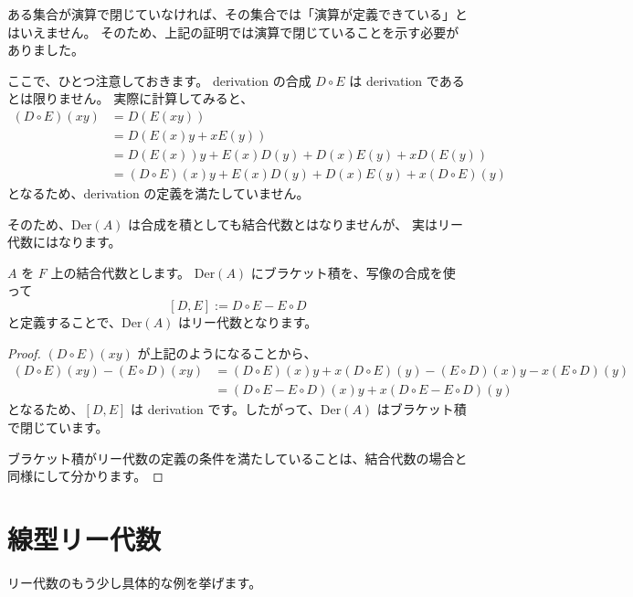 \documentclass{ltjsarticle}
\begin{document}
ある集合が演算で閉じていなければ、その集合では「演算が定義できている」とはいえません。
そのため、上記の証明では演算で閉じていることを示す必要がありました。

ここで、ひとつ注意しておきます。
derivation の合成 $D \circ E$ は derivation であるとは限りません。
実際に計算してみると、
\begin{align*}
    (D \circ E)(xy) & = D(E(xy))                                                \\
                    & = D(E(x)y + xE(y))                                        \\
                    & = D(E(x))y + E(x)D(y) + D(x)E(y) + xD(E(y))               \\
                    & = (D \circ E)(x)y + E(x)D(y) + D(x)E(y) + x(D \circ E)(y)
\end{align*}
となるため、derivation の定義を満たしていません。

そのため、$\mathrm{Der}(A)$ は合成を積としても結合代数とはなりませんが、
実はリー代数にはなります。

\begin{example}
    $A$ を $F$ 上の結合代数とします。
    $\mathrm{Der}(A)$ にブラケット積を、写像の合成を使って
    \[
        [D, E] := D \circ E - E \circ D
    \]
    と定義することで、$\mathrm{Der}(A)$ はリー代数となります。
\end{example}

\begin{proof}
    $(D \circ E)(xy)$ が上記のようになることから、
    \begin{align*}
        (D \circ E)(xy) - (E \circ D)(xy) & = (D \circ E)(x)y + x(D \circ E)(y) - (E \circ D)(x)y - x(E \circ D)(y) \\
                                          & = (D \circ E - E \circ D)(x)y + x(D \circ E - E \circ D)(y)
    \end{align*}
    となるため、$[D, E]$ は derivation です。したがって、$\mathrm{Der}(A)$ はブラケット積で閉じています。

    ブラケット積がリー代数の定義の条件を満たしていることは、結合代数の場合と同様にして分かります。
\end{proof}

\section{線型リー代数}

リー代数のもう少し具体的な例を挙げます。
\end{document}

